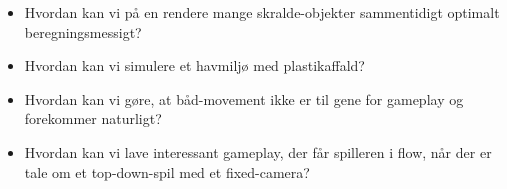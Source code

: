 \begin{itemize}
\item Hvordan kan vi på en rendere mange skralde-objekter sammentidigt optimalt beregningsmessigt?

\item Hvordan kan vi simulere et havmiljø med plastikaffald?

\item Hvordan kan vi gøre, at båd-movement ikke er til gene for gameplay og forekommer
naturligt?

\item Hvordan kan vi lave interessant gameplay, der får spilleren i flow, når der er tale om et top-down-spil med et fixed-camera?
\end{itemize}
